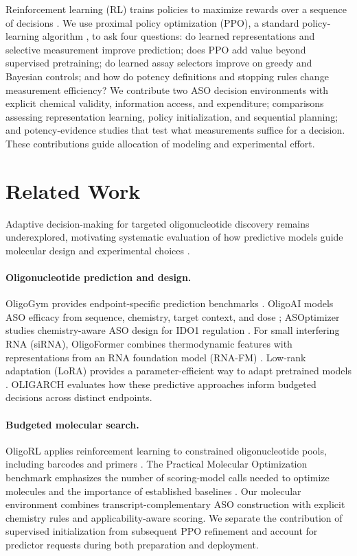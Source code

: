 \documentclass[letterpaper]{article}
\begin{document}
Reinforcement learning (RL) trains policies to maximize rewards over a sequence of decisions \citep{sutton}. We use proximal policy optimization (PPO), a standard policy-learning algorithm \citep{ppo}, to ask four questions: do learned representations and selective measurement improve prediction; does PPO add value beyond supervised pretraining; do learned assay selectors improve on greedy and Bayesian controls; and how do potency definitions and stopping rules change measurement efficiency? We contribute two ASO decision environments with explicit chemical validity, information access, and expenditure; comparisons assessing representation learning, policy initialization, and sequential planning; and potency-evidence studies that test what measurements suffice for a decision. These contributions guide allocation of modeling and experimental effort.

\section{Related Work}
Adaptive decision-making for targeted oligonucleotide discovery remains underexplored, motivating systematic evaluation of how predictive models guide molecular design and experimental choices \citep{oligoai,oligorl,oligogym}.

\paragraph{Oligonucleotide prediction and design.}
OligoGym provides endpoint-specific prediction benchmarks \citep{oligogym}. OligoAI models ASO efficacy from sequence, chemistry, target context, and dose \citep{oligoai}; ASOptimizer studies chemistry-aware ASO design for IDO1 regulation \citep{asoptimizer}. For small interfering RNA (siRNA), OligoFormer combines thermodynamic features with representations from an RNA foundation model (RNA-FM) \citep{oligoformer,rnafm}. Low-rank adaptation (LoRA) provides a parameter-efficient way to adapt pretrained models \citep{lora}. OLIGARCH evaluates how these predictive approaches inform budgeted decisions across distinct endpoints.

\paragraph{Budgeted molecular search.}
OligoRL applies reinforcement learning to constrained oligonucleotide pools, including barcodes and primers \citep{oligorl}. The Practical Molecular Optimization benchmark emphasizes the number of scoring-model calls needed to optimize molecules and the importance of established baselines \citep{pmo}. Our molecular environment combines transcript-complementary ASO construction with explicit chemistry rules and applicability-aware scoring. We separate the contribution of supervised initialization from subsequent PPO refinement and account for predictor requests during both preparation and deployment.
\end{document}
